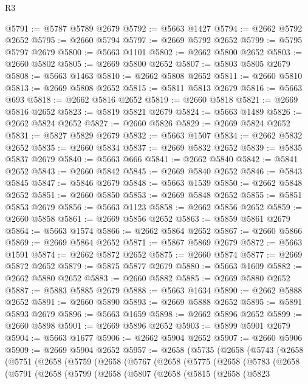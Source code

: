 \begin{lexlean}{R3}
\begin{coremodule}
@5791 := @5787 @5789 @2679
@5792 := @5663 @1427
@5794 := @2662 @5792 @2652
@5795 := @2660 @5794
@5797 := @2669 @5792 @2652
@5799 := @5795 @5797 @2679
@5800 := @5663 @1101
@5802 := @2662 @5800 @2652
@5803 := @2660 @5802
@5805 := @2669 @5800 @2652
@5807 := @5803 @5805 @2679
@5808 := @5663 @1463
@5810 := @2662 @5808 @2652
@5811 := @2660 @5810
@5813 := @2669 @5808 @2652
@5815 := @5811 @5813 @2679
@5816 := @5663 @693
@5818 := @2662 @5816 @2652
@5819 := @2660 @5818
@5821 := @2669 @5816 @2652
@5823 := @5819 @5821 @2679
@5824 := @5663 @1489
@5826 := @2662 @5824 @2652
@5827 := @2660 @5826
@5829 := @2669 @5824 @2652
@5831 := @5827 @5829 @2679
@5832 := @5663 @1507
@5834 := @2662 @5832 @2652
@5835 := @2660 @5834
@5837 := @2669 @5832 @2652
@5839 := @5835 @5837 @2679
@5840 := @5663 @666
@5841 := @2662 @5840
@5842 := @5841 @2652
@5843 := @2660 @5842
@5845 := @2669 @5840 @2652
@5846 := @5843 @5845
@5847 := @5846 @2679
@5848 := @5663 @1539
@5850 := @2662 @5848 @2652
@5851 := @2660 @5850
@5853 := @2669 @5848 @2652
@5855 := @5851 @5853 @2679
@5856 := @5663 @1123
@5858 := @2662 @5856 @2652
@5859 := @2660 @5858
@5861 := @2669 @5856 @2652
@5863 := @5859 @5861 @2679
@5864 := @5663 @1574
@5866 := @2662 @5864 @2652
@5867 := @2660 @5866
@5869 := @2669 @5864 @2652
@5871 := @5867 @5869 @2679
@5872 := @5663 @1591
@5874 := @2662 @5872 @2652
@5875 := @2660 @5874
@5877 := @2669 @5872 @2652
@5879 := @5875 @5877 @2679
@5880 := @5663 @1609
@5882 := @2662 @5880 @2652
@5883 := @2660 @5882
@5885 := @2669 @5880 @2652
@5887 := @5883 @5885 @2679
@5888 := @5663 @1634
@5890 := @2662 @5888 @2652
@5891 := @2660 @5890
@5893 := @2669 @5888 @2652
@5895 := @5891 @5893 @2679
@5896 := @5663 @1659
@5898 := @2662 @5896 @2652
@5899 := @2660 @5898
@5901 := @2669 @5896 @2652
@5903 := @5899 @5901 @2679
@5904 := @5663 @1677
@5906 := @2662 @5904 @2652
@5907 := @2660 @5906
@5909 := @2669 @5904 @2652
@5957 := @2658
    (@5735
      (@2658
        (@5743
          (@2658
            (@5751
              (@2658
                (@5759
                  (@2658
                    (@5767
                      (@2658
                        (@5775
                          (@2658
                            (@5783
                              (@2658
                                (@5791
                                  (@2658
                                    (@5799
                                      (@2658
                                        (@5807
                                          (@2658
                                            (@5815
                                              (@2658
                                                (@5823

\end{coremodule}
\end{lexlean}
